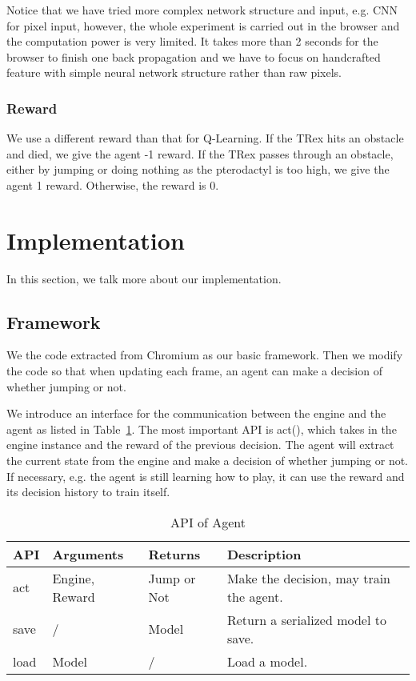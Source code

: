 \documentclass[conference]{IEEEtran}
\begin{document}
Notice that we have tried more complex network structure and input, e.g. CNN for pixel input, however, the whole experiment is carried out in the browser and the computation power is very limited. It takes more than 2 seconds for the browser to finish one back propagation and we have to focus on handcrafted feature with simple neural network structure rather than raw pixels.

\subsubsection{Reward}
We use a different reward than that for Q-Learning. If the TRex hits an obstacle and died, we give the agent -1 reward. If the TRex passes through an obstacle, either by jumping or doing nothing as the pterodactyl is too high, we give the agent 1 reward. Otherwise, the reward is 0.

\section{Implementation}
In this section, we talk more about our implementation.
\subsection{Framework}
We the code extracted from Chromium \cite{TRexGame} as our basic framework. Then we modify the code so that when updating each frame, an agent can make a decision of whether jumping or not. 

We introduce an interface for the communication between the engine and the agent as listed in Table~\ref{tab:api}. The most important API is act(), which takes in the engine instance and the reward of the previous decision. The agent will extract the current state from the engine and make a decision of whether jumping or not. If necessary, e.g. the agent is still learning how to play, it can use the reward and its decision history to train itself.

\begin{table}[!t]
\renewcommand{\arraystretch}{1.3}
\caption{API of Agent}
\label{tab:api}
\centering
\begin{tabular}{l l l l}
\hline
API & Arguments & Returns & Description \\
\hline
act & Engine, Reward & Jump or Not & Make the decision, may train the agent.\\
\hline
save & / & Model & Return a serialized model to save.\\
\hline
load & Model & / & Load a model. \\
\hline
\end{tabular}
\end{table}
\end{document}
